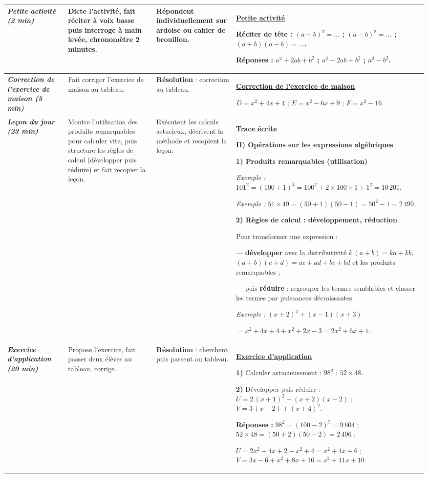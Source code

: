 \documentclass[10pt]{article}
\newcommand{\titreR}[1]{\underline{\textcolor{rougetitre}{\bfseries #1}}}
\newcommand{\app}{\titreR{Exercice d'application}}
\newcommand{\seance}[1]{\fcolorbox{bleuseance}{bleufond}{\textcolor{bleuseance}{\bfseries #1}}}
\newcommand{\moment}[1]{\textbf{\itshape #1}}
\newcommand{\mclef}[1]{\colorbox{jaunesurl}{#1}}
\begin{document}
\begin{longtable}{|p{2.35cm}|p{5.35cm}|p{4.55cm}|p{13.85cm}|}
\hline
\seance{SEANCE 3} \newline \moment{Petite activité (2 min)} &
Dicte l'activité, fait réciter à voix basse puis interroge à main levée,
chronomètre 2 minutes. &
Répondent individuellement sur ardoise ou cahier de brouillon. &
\titreR{Petite activité} \par
Réciter de tête : $(a+b)^2=\dots$ ; \; $(a-b)^2=\dots$ ; \; $(a+b)(a-b)=\dots$. \par
\textbf{Réponses :} $a^2+2ab+b^2$ ; \; $a^2-2ab+b^2$ ; \; $a^2-b^2$. \\ \hline

\moment{Correction de l'exercice de maison (5 min)} &
Fait corriger l'exercice de maison au tableau. &
\textbf{Résolution} : correction au tableau. &
\titreR{Correction de l'exercice de maison} \par
$D=x^2+4x+4$ ; \; $E=x^2-6x+9$ ; \; $F=x^2-16$. \\ \hline

\moment{Leçon du jour (23 min)} &
Montre l'utilisation des produits remarquables pour calculer vite, puis structure
les règles de calcul (développer puis réduire) et fait recopier la leçon. &
Exécutent les calculs astucieux, décrivent la méthode et recopient la leçon. &
\titreR{Trace écrite} \par
\textbf{II) Opérations sur les expressions algébriques} \par
\textbf{1) Produits remarquables (utilisation)} \par
\textit{Exemple :} $101^2=(100+1)^2=100^2+2\times100\times1+1^2=10\,201$. \par
\textit{Exemple :} $51\times49=(50+1)(50-1)=50^2-1=2\,499$. \par
\textbf{2) Règles de calcul : développement, réduction} \par
Pour transformer une expression : \par
— \textbf{développer} avec la distributivité $k\,(a+b)=ka+kb$,
$(a+b)(c+d)=ac+ad+bc+bd$ et les \mclef{produits remarquables} ; \par
— puis \textbf{réduire} : regrouper les termes semblables et classer les termes
par puissances décroissantes. \par
\textit{Exemple :} $(x+2)^2+(x-1)(x+3)$ \par
$=x^2+4x+4+x^2+2x-3=2x^2+6x+1$. \\ \hline

\moment{Exercice d'application (20 min)} &
Propose l'exercice, fait passer deux élèves au tableau, corrige. &
\textbf{Résolution} : cherchent puis passent au tableau. &
\app \par
\textbf{1)} Calculer astucieusement : \; $98^2$ ; \; $52\times48$. \par
\textbf{2)} Développer puis réduire : \; $U=2\,(x+1)^2-(x+2)(x-2)$ ; \;
$V=3\,(x-2)+(x+4)^2$. \par
\textbf{Réponses :} $98^2=(100-2)^2=9\,604$ ; \; $52\times48=(50+2)(50-2)=2\,496$ ; \par
$U=2x^2+4x+2-x^2+4=x^2+4x+6$ ; \; $V=3x-6+x^2+8x+16=x^2+11x+10$. \\ \hline


\end{longtable}
\end{document}
